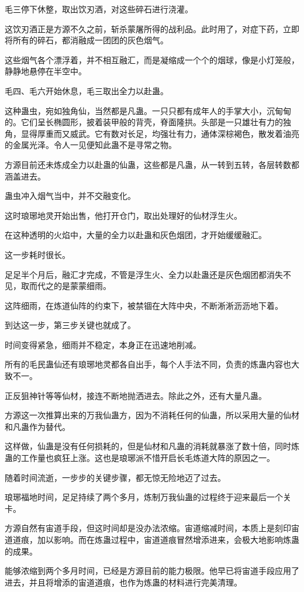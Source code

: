 \begin{this_body}
毛三停下休整，取出饮刃酒，对这些碎石进行浇灌。

这饮刃酒正是方源不久之前，斩杀蒙屠所得的战利品。此时用了，对症下药，立即将所有的碎石，都消融成一团团的灰色烟气。

这些烟气各个漂浮着，并不相互融汇，而是凝缩成一个个的烟球，像是小灯笼般，静静地悬停在半空中。

毛四、毛六开始休息，毛三取出全力以赴蛊。

这种蛊虫，宛如独角仙，当然都是凡蛊。一只只都有成年人的手掌大小，沉甸甸的。它们呈长椭圆形，披着装甲般的背壳，脊面隆拱。头部是一只雄壮有力的独角，显得厚重而又威武。它有数对长足，均强壮有力，通体深棕褐色，散发着油亮的金属光泽。令人一见便知此蛊不是寻常之物。

方源目前还未炼成全力以赴蛊的仙蛊，这些都是凡蛊，从一转到五转，各层转数都涵盖进去。

蛊虫冲入烟气当中，并不交融变化。

这时琅琊地灵开始出售，他打开仓门，取出处理好的仙材浮生火。

在这种透明的火焰中，大量的全力以赴蛊和灰色烟团，才开始缓缓融汇。

这一步耗时很长。

足足半个月后，融汇才完成，不管是浮生火、全力以赴蛊还是灰色烟团都消失不见，取而代之的是蒙蒙细雨。

这阵细雨，在炼道仙阵的约束下，被禁锢在大阵中央，不断淅淅沥沥地下着。

到达这一步，第三步关键也就成了。

时间变得紧急，细雨并不稳定，本身正在迅速地削减。

所有的毛民蛊仙还有琅琊地灵都各自出手，每个人手法不同，负责的炼蛊内容也大致不一。

正反狙神针等等仙材，接连不断地抛洒进去。除此之外，还有大量凡蛊。

方源这一次推算出来的万我仙蛊方，因为不消耗任何的仙蛊，所以采用大量的仙材和凡蛊作为替代。

这样做，仙蛊是没有任何损耗的，但是仙材和凡蛊的消耗就暴涨了数十倍，同时炼蛊的工作量也疯狂上涨。这也是琅琊派不惜开启长毛炼道大阵的原因之一。

随着时间流逝，一步步的关键步骤，都无惊无险地迈了过去。

琅琊福地时间，足足持续了两个多月，炼制万我仙蛊的过程终于迎来最后一个关卡。

方源自然有宙道手段，但这时间却是没办法浓缩。宙道缩减时间，本质上是刻印宙道道痕，加以影响。而在炼蛊过程中，宙道道痕冒然增添进来，会极大地影响炼蛊的成果。

能够浓缩到两个多月时间，已经是方源目前的能力极限。他早已将宙道手段应用了进去，并且将增添的宙道道痕，也作为炼蛊的材料进行完美清理。


\end{this_body}
